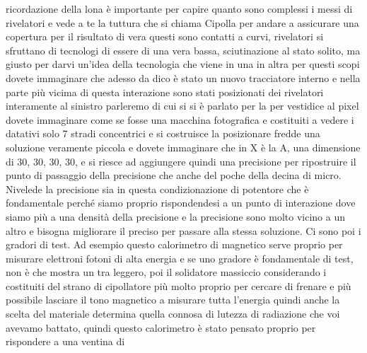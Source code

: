 {ricordazione della lona è importante per capire quanto sono complessi i messi di rivelatori e vede a te la tuttura che si chiama Cipolla per andare a assicurare una copertura per il risultato di vera questi sono contatti a curvi, rivelatori si sfruttano di tecnologi di essere di una vera bassa, sciutinazione al stato solito, ma giusto per darvi un'idea della tecnologia che viene in una in altra per questi scopi dovete immaginare che adesso da dico è stato un nuovo tracciatore interno e nella parte più vicima di questa interazione sono stati posizionati dei rivelatori interamente al sinistro parleremo di cui si si è parlato per la per vestidice al pixel dovete immaginare come se fosse una macchina fotografica e costituiti a vedere i datativi solo 7 stradi concentrici e si costruisce la posizionare fredde una soluzione veramente piccola e dovete immaginare che in X è la A, una dimensione di 30, 30, 30, 30, e si riesce ad aggiungere quindi una precisione per ripostruire il punto di passaggio della precisione che anche del poche della decina di micro. Nivelede la precisione sia in questa condizionazione di potentore che è fondamentale perché siamo proprio rispondendesi a un punto di interazione dove siamo più a una densità della precisione e la precisione sono molto vicino a un altro e bisogna migliorare il preciso per passare alla stessa soluzione. Ci sono poi i gradori di test. Ad esempio questo calorimetro di magnetico serve proprio per misurare elettroni fotoni di alta energia e se uno gradore è fondamentale di test, non è che mostra un tra leggero, poi il solidatore massiccio considerando i costituiti del strano di cipollatore più molto proprio per cercare di frenare e più possibile lasciare il tono magnetico a misurare tutta l'energia quindi anche la scelta del materiale determina quella connosa di lutezza di radiazione che voi avevamo battato, quindi questo calorimetro è stato pensato proprio per rispondere a una ventina di 

}
